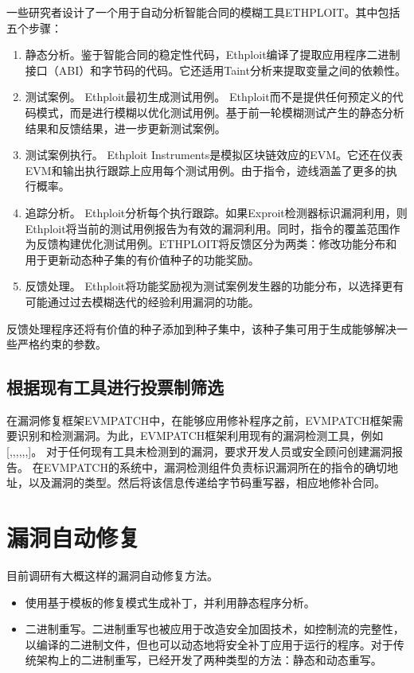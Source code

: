\documentclass{SCIS2022cn}
\begin{document}
一些研究者设计了一个用于自动分析智能合同的模糊工具ETHPLOIT\cite{8}。其中包括五个步骤：

\begin{enumerate}
    \item 静态分析。鉴于智能合同的稳定性代码，Ethploit编译了提取应用程序二进制接口（ABI）和字节码的代码。它还适用Taint分析来提取变量之间的依赖性。
    \item 测试案例。 Ethploit最初生成测试用例。 Ethploit而不是提供任何预定义的代码模式，而是进行模糊以优化测试用例。基于前一轮模糊测试产生的静态分析结果和反馈结果，进一步更新测试案例。
    \item 测试案例执行。 Ethploit Instruments是模拟区块链效应的EVM。它还在仪表EVM和输出执行跟踪上应用每个测试用例。由于指令，迹线涵盖了更多的执行概率。
    \item 追踪分析。 Ethploit分析每个执行跟踪。如果Exproit检测器标识漏洞利用，则Ethploit将当前的测试用例报告为有效的漏洞利用。同时，指令的覆盖范围作为反馈构建优化测试用例。ETHPLOIT将反馈区分为两类：修改功能分布和用于更新动态种子集的有价值种子的功能奖励。
    \item 反馈处理。 Ethploit将功能奖励视为测试案例发生器的功能分布，以选择更有可能通过过去模糊迭代的经验利用漏洞的功能。
\end{enumerate}

反馈处理程序还将有价值的种子添加到种子集中，该种子集可用于生成能够解决一些严格约束的参数。

\subsection{根据现有工具进行投票制筛选}

在漏洞修复框架EVMPATCH\cite{9}中，在能够应用修补程序之前，EVMPATCH框架需要识别和检测漏洞。为此，EVMPATCH框架利用现有的漏洞检测工具，例如[\cite{10},\cite{11},\cite{12},\cite{13},\cite{14},\cite{15},\cite{16}]。 对于任何现有工具未检测到的漏洞，要求开发人员或安全顾问创建漏洞报告。 在EVMPATCH的系统中，漏洞检测组件负责标识漏洞所在的指令的确切地址，以及漏洞的类型。然后将该信息传递给字节码重写器，相应地修补合同。

\section{漏洞自动修复}

目前调研有大概这样的漏洞自动修复方法。

\begin{itemize}
    \item 使用基于模板的修复模式生成补丁\cite{17}，并利用静态程序分析。
    \item 二进制重写\cite{9}。二进制重写也被应用于改造安全加固技术，如控制流的完整性，以编译的二进制文件，但也可以动态地将安全补丁应用于运行的程序。对于传统架构上的二进制重写，已经开发了两种类型的方法：静态和动态重写。
\end{itemize}
\end{document}
